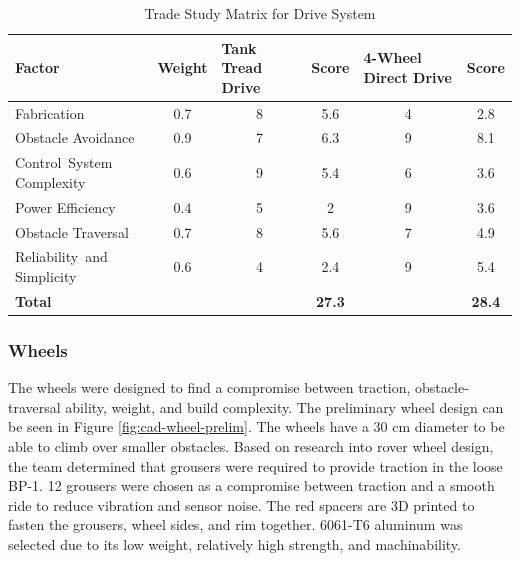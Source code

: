 \documentclass[class=article, crop=false]{standalone}
\begin{document}
\FloatBarrier
	\begin{table}[h]
	\footnotesize
	\centering
	\begin{tabular}{ | p{8em} | m{4em} | m{6em} | m{3em} | m{8em} | m{3em} | }
 	\hline
 		\rowcolor[gray]{0.8}
 		\textbf{Factor} &\textbf{Weight} &\textbf{Tank Tread Drive} &\textbf{Score} &\textbf{4-Wheel Direct Drive} &\textbf{Score}  \\ 
 		\hline
		Fabrication                       &  \multicolumn{1}{c|}{0.7}  &  \multicolumn{1}{c|}{8}    &  \multicolumn{1}{c|}{5.6}  &  \multicolumn{1}{c|}{4}    &  \multicolumn{1}{c|}{2.8}   \\ 
 		\hline
 		Obstacle \mbox{Avoidance}         &  \multicolumn{1}{c|}{0.9}  &  \multicolumn{1}{c|}{7}    &  \multicolumn{1}{c|}{6.3}  &  \multicolumn{1}{c|}{9}    &  \multicolumn{1}{c|}{8.1}   \\ 
 		\hline
 		\mbox{Control System} Complexity  &  \multicolumn{1}{c|}{0.6}  &  \multicolumn{1}{c|}{9}    &  \multicolumn{1}{c|}{5.4}  &  \multicolumn{1}{c|}{6}    &  \multicolumn{1}{c|}{3.6}   \\
 		\hline
 		Power \mbox{Efficiency}           &  \multicolumn{1}{c|}{0.4}  &  \multicolumn{1}{c|}{5}    &  \multicolumn{1}{c|}{2}    &  \multicolumn{1}{c|}{9}    &  \multicolumn{1}{c|}{3.6}   \\ 
 		\hline
 		Obstacle \mbox{Traversal}         &  \multicolumn{1}{c|}{0.7}  &  \multicolumn{1}{c|}{8}    &  \multicolumn{1}{c|}{5.6}  &  \multicolumn{1}{c|}{7}    &  \multicolumn{1}{c|}{4.9}   \\
 		\hline
 		\mbox{Reliability and} Simplicity &  \multicolumn{1}{c|}{0.6}  &  \multicolumn{1}{c|}{4}    &  \multicolumn{1}{c|}{2.4}  &  \multicolumn{1}{c|}{9}    &  \multicolumn{1}{c|}{5.4}   \\
 		\hline
 		\rowcolor[gray]{0.9}
 		\textbf{Total}                    &       &       &\multicolumn{1}{c|}{\textbf{27.3}}&       &\multicolumn{1}{c|}{\textbf{28.4}}\\
 		\hline
	\end{tabular}
	\caption{Trade Study Matrix for Drive System }
		\label{table:drive_trade_study}
	\end{table}
	\FloatBarrier
	
	\subsubsection{Wheels}
	The wheels were designed to find a compromise between traction, obstacle-traversal ability, weight, and build complexity. The preliminary wheel design can be seen in Figure \ref{fig:cad-wheel-prelim}. The wheels have a 30 cm diameter to be able to climb over smaller obstacles. Based on research into rover wheel design, the team determined that grousers were required to provide traction in the loose BP-1. 12 grousers were chosen as a compromise between traction and a smooth ride to reduce vibration and sensor noise. The red spacers are 3D printed to fasten the grousers, wheel sides, and rim together. 6061-T6 aluminum was selected due to its low weight, relatively high strength, and machinability.
	
\end{document}
